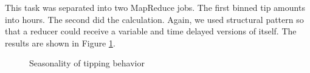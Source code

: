 \documentclass[12pt,a4paper]{article}
\begin{document}
  This task was separated into two MapReduce jobs. The first binned tip amounts into hours. The second did the calculation. Again, we used structural pattern so that a reducer could receive a variable and time delayed versions of itself. The results are shown in Figure \ref{fig:autocorr}.

  \begin{figure}[h!]
    \centering
    \caption{Seasonality of tipping behavior}
    \label{fig:autocorr}


\end{figure}
\end{document}
